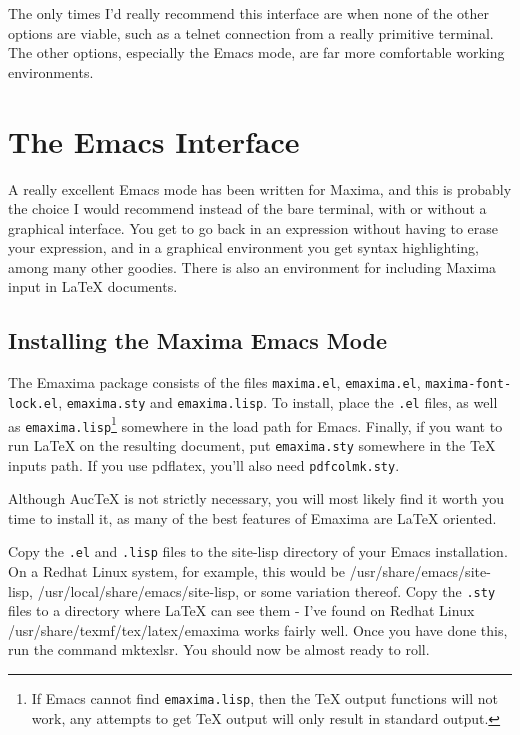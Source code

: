 The only times I'd really recommend this interface are when none of
the other options are viable, such as a telnet connection from a really
primitive terminal.  The other options, especially
the Emacs mode, are far more comfortable working environments. 

\section{The Emacs Interface}

A really excellent Emacs mode has been written for Maxima, and this is probably the
choice I would recommend instead of the bare terminal, with or without
a graphical interface. You get to
go back in an expression without having to erase your expression,
and in a graphical environment you get syntax highlighting, among many other
goodies.  There is also an environment for including Maxima input in LaTeX
documents.

\subsection{Installing the Maxima Emacs Mode}

\noindent
The Emaxima package consists of the files \texttt{maxima.el},
\texttt{emaxima.el},
\texttt{maxima-font-lock.el}, \texttt{emaxima.sty} and \texttt{emaxima.lisp}.
To install, place the \texttt{.el} files, as well as
\texttt{emaxima.lisp}\footnote{If Emacs cannot find
  \texttt{emaxima.lisp}, then the \TeX{} output functions will not
  work, any attempts to get \TeX{} output will only result in standard
  output.} 
somewhere in the load path for Emacs.
Finally, if you want to run \LaTeX{} on the resulting document, put
\texttt{emaxima.sty} somewhere in the \TeX{} inputs path.  If you use
pdflatex, you'll also need \texttt{pdfcolmk.sty}.

Although AucTeX is not strictly necessary, you will most likely find it worth
you time to install it, as many of the best features of Emaxima are LaTeX
oriented.  

Copy the \texttt{.el} and \texttt{.lisp} files to the site-lisp directory of your Emacs installation.
On a Redhat Linux system, for example, this would be /usr/share/emacs/site-lisp,
/usr/local/share/emacs/site-lisp, or some variation thereof.  Copy the \texttt{.sty}
files to a directory where LaTeX can see them - I've found on Redhat Linux
/usr/share/texmf/tex/latex/emaxima works fairly well.  Once you have done this,
run the command mktexlsr.  You should now be almost ready to roll.

